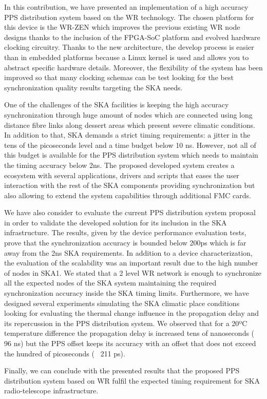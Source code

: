 In this contribution, we have presented an implementation of a high accuracy 
PPS distribution system based on the WR technology. The chosen platform for 
this device is the WR-ZEN which improves the previous existing WR node designs 
thanks to the inclusion of the FPGA-SoC platform and evolved hardware clocking 
circuitry. Thanks to the new architecture, the develop process is easier than 
in embedded platforms because a Linux kernel is used and allows you to abstract 
specific hardware details. Moreover, the flexibility of the system has been 
improved so that many clocking schemas can be test looking for the best 
synchronization quality results targeting the SKA needs.

One of the challenges of the SKA facilities is keeping the high accuracy 
synchronization through huge amount of nodes which are connected using long 
distance fibre links along dessert areas which present severe climatic 
conditions. In addition to that, SKA demands a strict timing requirements: a 
jitter in the tens of the picoseconds level and a time budget below 10 ns. 
However, not all of this budget is available for the PPS distribution system 
which needs to maintain the timing accuracy below 2ns. The proposed developed 
system creates a ecosystem with several applications, drivers and scripts that 
eases the user interaction with the rest of the 
SKA components providing synchronization but also allowing to extend the system 
capabilities through additional FMC cards.

We have also consider to evaluate the current PPS distribution system proposal 
in order to validate the developed solution for its inclusion in the SKA 
infrastructure. The results, given by the device performance evaluation tests, 
prove that the synchronization accuracy is bounded below 200ps which is far 
away from the 2ns SKA requirements. In addition to a device characterization, 
the evaluation of the scalability was an important result due to the high 
number of nodes in SKA1. We stated that a 2 level WR network is enough to 
synchronize all the expected nodes of the SKA system maintaining the required 
synchronization accuracy inside the SKA timing limits. Furthermore, we have 
designed several experiments simulating the SKA climatic place conditions 
looking for evaluating the thermal change influence in the propagation delay 
and its repercussion in the PPS distribution system. We observed that for a 
20ºC temperature difference the propagation delay is increased tens of 
nanoseconds (~ 96 ns) but the PPS offset keeps its accuracy with an offset that 
does not exceed the hundred of picoseconds (~ 211 ps). 

Finally, we can conclude with the presented results that the proposed PPS 
distribution system based on WR fulfil the expected timing requirement for SKA 
radio-telescope infrastructure.